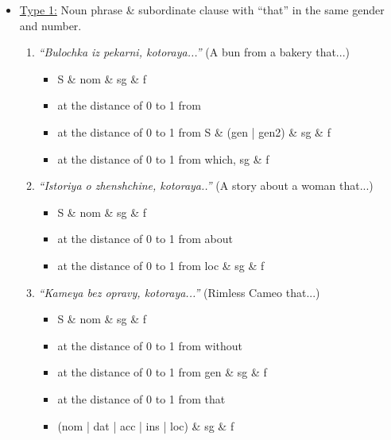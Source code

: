 \documentclass[11pt]{article}
\begin{document}
\begin{itemize}[leftmargin=1em,noitemsep,topsep=0.1pt]
    \item \underline{Type 1:} Noun phrase \& subordinate clause with ``that'' in the same gender and number.
    
    \begin{enumerate}[leftmargin=0.5em,noitemsep,topsep=0.1pt]
        \item \textit{``Bulochka iz pekarni, kotoraya...''} (A bun from a bakery that...)
        
        \begin{itemize}[noitemsep,topsep=0.1pt]
            \item S \& nom \& sg \& f
            \item at the distance of 0 to 1 from
            \item at the distance of 0 to 1 from S \& (gen | gen2) \& sg \& f
            \item at the distance of 0 to 1 from which, sg \& f
        \end{itemize}
        
        \item \textit{``Istoriya o zhenshchine, kotoraya..''} (A story about a woman that...)
        
        \begin{itemize}[noitemsep,topsep=0.1pt]
            \item S \& nom \& sg \& f
            \item at the distance of 0 to 1 from about
            \item at the distance of 0 to 1 from loc \& sg \& f
        \end{itemize}
        
        
        \item \textit{``Kameya bez opravy, kotoraya...''} (Rimless Cameo that...)
        
        \begin{itemize}[noitemsep,topsep=0.1pt]
            \item S \& nom \& sg \& f
            \item at the distance of 0 to 1 from without
            \item at the distance of 0 to 1 from gen \& sg \& f
            \item at the distance of 0 to 1 from that
            \item (nom | dat | acc | ins | loc) \& sg \& f
        \end{itemize}
        

\end{enumerate}
\end{itemize}
\end{document}
